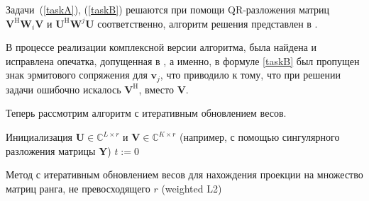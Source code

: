 \documentclass[specialist,
               substylefile = spbu.rtx,
               subf,href,colorlinks=true, 12pt]{disser}
\begin{document}
Задачи~(\ref{taskA}), (\ref{taskB}) решаются при помощи QR-разложения матриц $\mathbf{V}^\mathrm{H}\mathbf{W}_i\mathbf{V}$ и $\mathbf{U}^\mathrm{H}\mathbf{W}^j\mathbf{U}$ соответственно, алгоритм решения представлен в \cite{IRLS}.

В процессе реализации комплексной версии алгоритма, была найдена и исправлена опечатка, допущенная в \cite{Chen}, а именно, в формуле \eqref{taskB} был пропущен знак эрмитового сопряжения для $\mathbf{v}_j$, что приводило к тому, что при решении задачи ошибочно искалось $\mathbf{V}^\mathrm{H}$, вместо $\mathbf{V}$.

Теперь рассмотрим алгоритм с итеративным обновлением весов.

\begin{algorithm}[H]
\SetAlgoLined
{}
 Инициализация $\mathbf{U} \in \mathbb{C}^{L\times r}$ и $\mathbf{V} \in \mathbb{C}^{K\times r}$ (например, с помощью сингулярного разложения матрицы $\mathbf{Y}$)\;
 $t := 0$\;
 \caption{Метод с итеративным обновлением весов для нахождения проекции на множество матриц ранга, не превосходящего $r$ (weighted L2)}
\end{algorithm}
\end{document}
